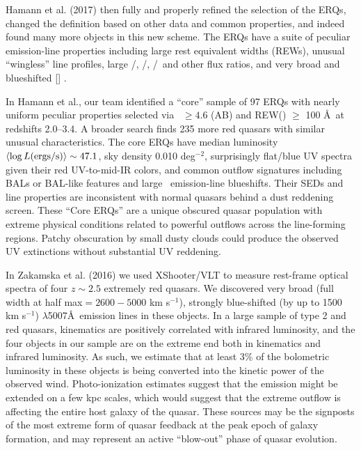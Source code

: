 Hamann et al. (2017) then fully and properly refined the selection of
the ERQs, changed the definition based on other data and common
properties, and indeed found many more objects in this new scheme. The
ERQs have a suite of peculiar emission-line properties including large
rest equivalent widths (REWs), unusual ``wingless'' line profiles,
large \nv /\lya , \nv /\civ , \siiv /\civ\ and other flux ratios, and
very broad and blueshifted [\oiii ] .

In Hamann et al., our team identified a ``core'' sample of 97 ERQs
with nearly uniform peculiar properties selected via \imw\ $\ge 4.6$
(AB) and REW(\civ ) $\ge$ 100 \AA\ at redshifts 2.0--3.4. A broader
search finds 235 more red quasars with similar unusual
characteristics. The core ERQs have median luminosity $\left<\log L
({\rm ergs/s})\right> \sim 47.1$, sky density 0.010 deg$^{-2}$,
surprisingly flat/blue UV spectra given their red UV-to-mid-IR colors,
and common outflow signatures including BALs or BAL-like features and
large \civ\ emission-line blueshifts. Their SEDs and line properties
are inconsistent with normal quasars behind a dust reddening
screen. These ``Core ERQs'' are a unique obscured quasar population
with extreme physical conditions related to powerful outflows across
the line-forming regions. Patchy obscuration by small dusty clouds
could produce the observed UV extinctions without substantial UV
reddening.


\smallskip
\smallskip
\noindent
In Zakamska et al. (2016) we used XShooter/VLT to measure rest-frame
optical spectra of four $z\sim 2.5$ extremely red quasars. We
discovered very broad (full width at half max$= 2600-5000$ km
s$^{-1}$), strongly blue-shifted (by up to 1500 km s$^{-1}$)
\oiii$\lambda$5007\AA\ emission lines in these objects. In a large
sample of type 2 and red quasars, \oiii kinematics are positively
correlated with infrared luminosity, and the four objects in our
sample are on the extreme end both in \oiii kinematics and infrared
luminosity.
As such, we estimate that at least 3\% of the bolometric luminosity in
these objects is being converted into the kinetic power of the
observed wind. Photo-ionization estimates suggest that the \oiii
emission might be extended on a few kpc scales, which would suggest
that the extreme outflow is affecting the entire host galaxy of the
quasar. These sources may be the signposts of the most extreme form of
quasar feedback at the peak epoch of galaxy formation, and may
represent an active ``blow-out'' phase of quasar evolution. 


